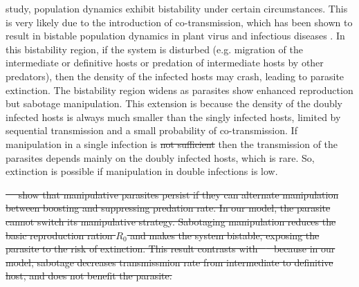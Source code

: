 \documentclass[a4paper]{scrartcl}
\providecommand{\DIFaddtex}[1]{{\protect\color{blue}\uwave{#1}}} %
\providecommand{\DIFdeltex}[1]{{\protect\color{red}\sout{#1}}}                      %
\providecommand{\DIFaddbegin}{} %
\providecommand{\DIFaddend}{} %
\providecommand{\DIFdelbegin}{} %
\providecommand{\DIFdelend}{} %
\providecommand{\DIFadd}[1]{\texorpdfstring{\DIFaddtex{#1}}{#1}} %
\providecommand{\DIFdel}[1]{\texorpdfstring{\DIFdeltex{#1}}{}} %
\newcommand{\DIFscaledelfig}{0.5}
\newlength{\DIFdelgraphicswidth} %
\newlength{\DIFdelgraphicsheight} %
\newcommand{\DIFaddincludegraphics}[2][]{{\color{blue}\fbox{\DIFOincludegraphics[#1]{#2}}}} %
\newcommand{\DIFdelincludegraphics}[2][]{%
\sbox{\DIFdelgraphicsbox}{\DIFOincludegraphics[#1]{#2}}%
\settoboxwidth{\DIFdelgraphicswidth}{\DIFdelgraphicsbox} %
\settoboxtotalheight{\DIFdelgraphicsheight}{\DIFdelgraphicsbox} %
\scalebox{\DIFscaledelfig}{%
\parbox[b]{\DIFdelgraphicswidth}{\usebox{\DIFdelgraphicsbox}\\[-\baselineskip] \rule{\DIFdelgraphicswidth}{0em}}\llap{\resizebox{\DIFdelgraphicswidth}{\DIFdelgraphicsheight}{%
\setlength{\unitlength}{\DIFdelgraphicswidth}%
\begin{picture}(1,1)%
\thicklines\linethickness{2pt} %
{\color[rgb]{1,0,0}\put(0,0){\framebox(1,1){}}}%
{\color[rgb]{1,0,0}\put(0,0){\line( 1,1){1}}}%
{\color[rgb]{1,0,0}\put(0,1){\line(1,-1){1}}}%
\end{picture}%
}\hspace*{3pt}}} %
} %
\DeclareRobustCommand{\DIFaddbegin}{\DIFOaddbegin \let\includegraphics\DIFaddincludegraphics} %
\DeclareRobustCommand{\DIFaddend}{\DIFOaddend \let\includegraphics\DIFOincludegraphics} %
\DeclareRobustCommand{\DIFdelbegin}{\DIFOdelbegin \let\includegraphics\DIFdelincludegraphics} %
\DeclareRobustCommand{\DIFdelend}{\DIFOaddend \let\includegraphics\DIFOincludegraphics} %
\begin{document}
\DIFadd{In our }\DIFaddend study, population dynamics exhibit bistability under certain circumstances. 
This is very likely due to the introduction of co-transmission, which has been shown to result in bistable population dynamics in plant virus \cite{allen_modelling_2019} and infectious diseases \cite{gao_coinfection_2016-1}.
 In this bistability region, if the system is disturbed (e.g. migration of the intermediate or definitive hosts or predation of intermediate hosts by other predators), then the density of the infected hosts may crash, leading to parasite extinction. 
The bistability region widens as parasites show enhanced reproduction but sabotage manipulation. 
This extension is because the density of the doubly infected hosts is always much smaller than the singly infected hosts, limited by sequential transmission and a small probability of co-transmission. 
If manipulation in a single infection is \DIFdelbegin \DIFdel{not sufficient }\DIFdelend \DIFaddbegin \DIFadd{insufficient, }\DIFaddend then the transmission of the parasites depends mainly on the doubly infected hosts, which is rare. 
So, extinction is possible if manipulation in double infections is low.

\DIFdelbegin \DIFdel{\mbox{%
\cite{Iritani2018} }\hspace{0pt}%
show that manipulative parasites persist if they can alternate manipulation between boosting and suppressing predation rate. 
In our model, the parasite cannot switch its manipulative strategy. 
Sabotaging manipulation reduces the basic reproduction ration $R_0$ and makes the system bistable, exposing the parasite to the risk of extinction. This result contrasts with \mbox{%
\cite{Iritani2018} }\hspace{0pt}%
because in our model, sabotage decreases transmissmion rate from intermediate to definitive host, and does not benefit the parasite.
}%
\end{document}

